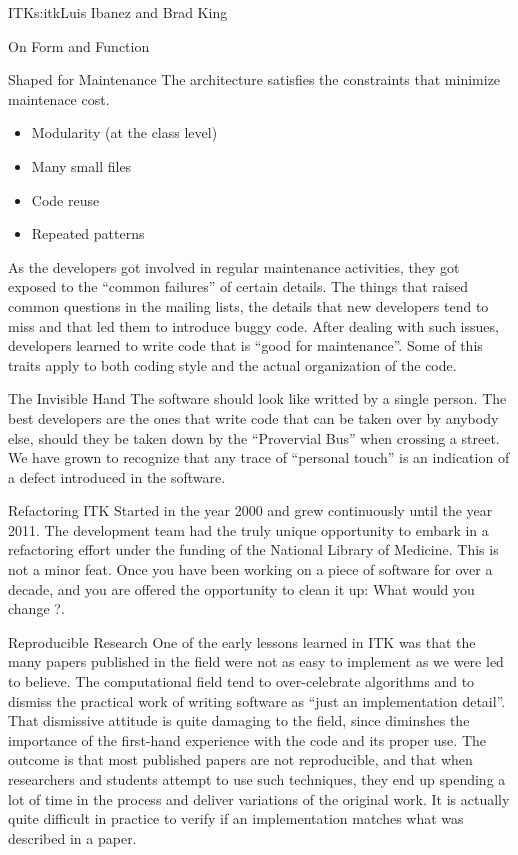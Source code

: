 \begin{aosachapter}{ITK}{s:itk}{Luis Ibanez and Brad King}
\begin{aosasect1}{On Form and Function}
\begin{aosasect2}{Shaped for Maintenance}
The architecture satisfies the constraints that minimize maintenace cost.
\begin{itemize}
\item Modularity (at the class level)
\item Many small files
\item Code reuse
\item Repeated patterns
\end{itemize}
\end{aosasect2}
As the developers got involved in regular maintenance activities, they
got exposed to the ``common failures'' of certain details. The things
that raised common questions in the mailing lists, the details that
new developers tend to miss and that led them to introduce buggy code.
After dealing with such issues, developers learned to write code that
is ``good for maintenance''. Some of this traits apply to both coding
style and the actual organization of the code.

\begin{aosasect2}{The Invisible Hand}
The software should look like writted by a single person. The best
developers are the ones that write code that can be taken over by
anybody else, should they be taken down by the ``Provervial Bus'' when
crossing a street. We have grown to recognize that any trace of
``personal touch'' is an indication of a defect introduced in the
software.
\end{aosasect2}

\end{aosasect1}

\begin{aosasect1}{Refactoring}
ITK Started in the year 2000 and grew continuously until the year
2011. The development team had the truly unique opportunity to embark
in a refactoring effort under the funding of the National Library of
Medicine. This is not a minor feat. Once you have been working on a
piece of software for over a decade, and you are offered the
opportunity to clean it up: What would you change ?.
\end{aosasect1}

\begin{aosasect1}{Reproducible Research}
One of the early lessons learned in ITK was that the many papers
published in the field were not as easy to implement as we were led to
believe. The computational field tend to over-celebrate algorithms and
to dismiss the practical work of writing software as ``just an
implementation detail''. That dismissive attitude is quite damaging to
the field, since diminshes the importance of the first-hand experience
with the code and its proper use. The outcome is that most published papers
are not reproducible, and that when researchers and students attempt to use
such techniques, they end up spending a lot of time in the process and deliver
variations of the original work. It is actually quite difficult in practice
to verify if an implementation matches what was described in a paper. 


\end{aosasect1}
\end{aosachapter}
